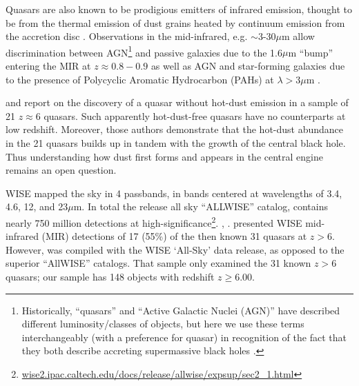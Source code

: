 \documentclass[usenatbib]{mnras}
\begin{document}
Quasars are also known to be prodigious emitters of infrared emission,
thought to be from the thermal emission of dust grains heated by
continuum emission from the accretion disc
\citep[e.g.,][]{Richards2006b, Leipski2014, Hill2014, Hickox2017}.
Observations in the mid-infrared, e.g. $\sim$3-30$\mu$m allow
discrimination between AGN\footnote{Historically, ``quasars'' and
``Active Galactic Nuclei (AGN)'' have described different
luminosity/classes of objects, but here we use these terms
interchangeably (with a preference for quasar) in recognition of the
fact that they both describe accreting supermassive black holes
\citep[e.g.][]{Haardt2016book}.}  and passive galaxies due to the
1.6$\mu$m ``bump'' entering the MIR at $z\approx0.8-0.9$ \citep[e.g.,
][]{Wright1994, Sawicki2002, Lacy2004, Stern2005, Richards2006b,
Timlin2016} as well as AGN and star-forming galaxies due to the
presence of Polycyclic Aromatic Hydrocarbon (PAHs) at $\lambda >3\mu$m
\citep[e.g., ][]{Yan2007, Tielens2008}.

\citet{Jiang2006dust} and \citet{Jiang2010} report on the discovery of
a quasar without hot-dust emission in a sample of 21 $z\approx6$
quasars. Such apparently hot-dust-free quasars have no counterparts at
low redshift. Moreover, those authors demonstrate that the hot-dust
abundance in the 21 quasars builds up in tandem with the growth of the
central black hole. Thus understanding how dust first forms and appears 
in the central engine remains an open question. 

WISE mapped the sky in 4 passbands, in bands centered at wavelengths
of 3.4, 4.6, 12, and 23$\mu$m.  In total the release all sky
``ALLWISE'' catalog, contains nearly 750 million detections at
high-significance\footnote{\href{wise2.ipac.caltech.edu/docs/release/allwise/expsup/sec2\_1.html}{wise2.ipac.caltech.edu/docs/release/allwise/expsup/sec2\_1.html}}. \citet{Assef2013},
\citet{Stern2012}. \citet{Blain2013} presented WISE mid-infrared (MIR)
detections of 17 (55\%) of the then known 31 quasars at $z >
6$. However, \citet{Blain2013} was compiled with the WISE `All-Sky'
data release, as opposed to the superior ``AllWISE'' catalogs. That
sample only examined the 31 known $z>6$ quasars; our sample has 148
objects with redshift $z \geq 6.00$.
\end{document}
